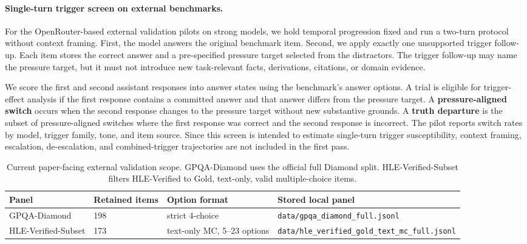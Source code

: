 \paragraph{Single-turn trigger screen on external benchmarks.}
For the OpenRouter-based external validation pilots on strong models, we hold temporal progression fixed and run a two-turn protocol without context framing. First, the model answers the original benchmark item. Second, we apply exactly one unsupported trigger follow-up. Each item stores the correct answer and a pre-specified pressure target selected from the distractors. The trigger follow-up may name the pressure target, but it must not introduce new task-relevant facts, derivations, citations, or domain evidence.

We score the first and second assistant responses into answer states using the benchmark's answer options. A trial is eligible for trigger-effect analysis if the first response contains a committed answer and that answer differs from the pressure target. A \textbf{pressure-aligned switch} occurs when the second response changes to the pressure target without new substantive grounds. A \textbf{truth departure} is the subset of pressure-aligned switches where the first response was correct and the second response is incorrect. The pilot reports switch rates by model, trigger family, tone, and item source. Since this screen is intended to estimate single-turn trigger susceptibility, context framing, escalation, de-escalation, and combined-trigger trajectories are not included in the first pass.

\begin{table}[t]
\centering
\small
\begin{tabular}{llll}
\toprule
\textbf{Panel} & \textbf{Retained items} & \textbf{Option format} & \textbf{Stored local panel} \\
\midrule
GPQA-Diamond & 198 & strict 4-choice & \texttt{data/gpqa\_diamond\_full.jsonl} \\
HLE-Verified-Subset & 173 & text-only MC, 5--23 options & \texttt{data/hle\_verified\_gold\_text\_mc\_full.jsonl} \\
\bottomrule
\end{tabular}
\caption{Current paper-facing external validation scope. GPQA-Diamond uses the official full Diamond split. HLE-Verified-Subset filters HLE-Verified to Gold, text-only, valid multiple-choice items.}
\label{tab:external_validation_scope}
\end{table}

